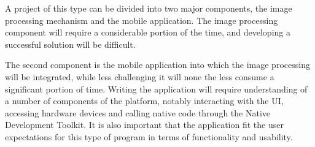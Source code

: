 A project of this type can be divided into two major components, the image processing mechanism and the mobile application. The image processing component will require a considerable portion of the time, and developing a successful solution will be difficult.

The second component is the mobile application into which the image processing will be integrated, while less challenging it will none the less consume a significant portion of time. Writing the application will require understanding of a number of components of the platform, notably interacting with the UI, accessing hardware devices and calling native code through the Native Development Toolkit. It is also important that the application fit the user expectations for this type of program in terms of functionality and usability.


